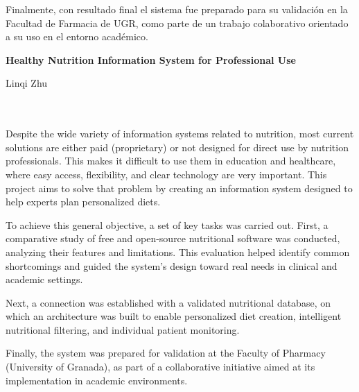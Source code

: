Finalmente, con resultado final el sistema fue preparado para su validación en la Facultad de Farmacia de UGR, como parte de un trabajo colaborativo orientado a su uso en el entorno académico. 
\cleardoublepage


\thispagestyle{empty}


\begin{center}
{\large\bfseries Healthy Nutrition Information System for Professional Use}\\
\end{center}
\begin{center}
Linqi Zhu\\
\end{center}

\\

\vspace{0.7cm}
\\

Despite the wide variety of information systems related to nutrition, most current solutions are either paid (proprietary) or not designed for direct use by nutrition professionals. This makes it difficult to use them in education and healthcare, where easy access, flexibility, and clear technology are very important. This project aims to solve that problem by creating an information system designed to help experts plan personalized diets.

To achieve this general objective, a set of key tasks was carried out. First, a comparative study of free and open-source nutritional software was conducted, analyzing their features and limitations. This evaluation helped identify common shortcomings and guided the system's design toward real needs in clinical and academic settings.

Next, a connection was established with a validated nutritional database, on which an architecture was built to enable personalized diet creation, intelligent nutritional filtering, and individual patient monitoring.

Finally, the system was prepared for validation at the Faculty of Pharmacy (University of Granada), as part of a collaborative initiative aimed at its implementation in academic environments.

\chapter*{}
\thispagestyle{empty}

